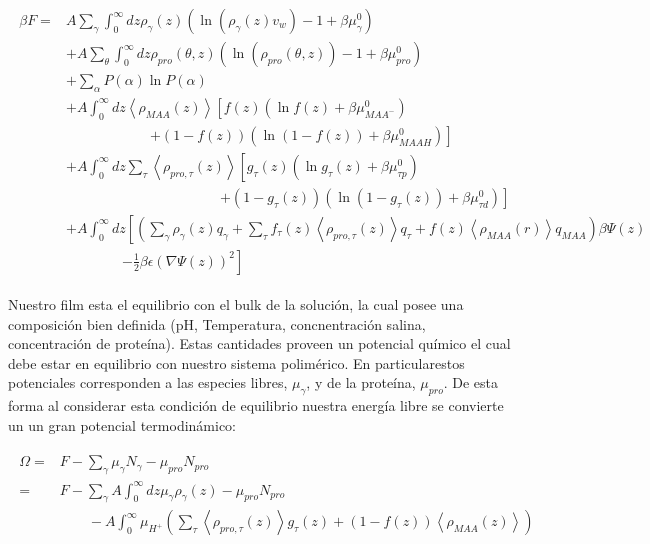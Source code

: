 \begin{align}
	\begin{aligned}
		\beta F=  & A\sum_{\gamma}\int_0^\infty{dz\rho_\gamma(z)\left(\ln \left(\rho_\gamma (z)v_w\right) -1 + \beta\mu^0_\gamma\right)} \\
		&+ A\sum_{\theta}\int_0^\infty{dz\rho_{pro}(\theta,z)\left(\ln \left(\rho_{pro}(\theta,z)\right) -1 + \beta\mu^0_{pro} \right)} \\
		&+ \sum_\alpha{P(\alpha)\ln P(\alpha)} \\
		& + A\int_0^\infty dz \left<\rho_{MAA}(z)\right> \left[f(z)(\ln f(z)+ \beta\mu^0_{MAA^-})\right.\\
		& \qquad\qquad\qquad \left.+(1-f(z))(\ln (1-f(z))+\beta\mu^0_{MAAH})\right] \\
		& + A\int_0^\infty dz \sum_\tau \left<\rho_{pro,\tau}(z)\right> \left[g_\tau(z)(\ln g_\tau(z)+ \beta\mu^0_{\tau p})\right.\\
		&\qquad \qquad \qquad\qquad \qquad\quad \left.+(1-g_\tau(z))(\ln (1-g_\tau(z))+\beta\mu^0_{\tau d})\right]   \\
		 & +A\int_0^\infty dz \left[\left(\sum_{\gamma } {\rho_\gamma(z) q_\gamma + \sum_\tau{f_\tau(z) \left<\rho_{pro,\tau}(z)\right> q_\tau} +  f(z)\left<\rho_{MAA}(r)\right>q_{MAA}}\right)\beta\Psi(z) \right. \\ & \qquad \qquad \left.-\frac{1}{2}\beta\epsilon(\nabla\Psi(z))^2 \right]
		\end{aligned}
\end{align}


Nuestro film esta el equilibrio con el bulk de la soluci\'on, la cual posee una composici\'on bien definida (pH, Temperatura, concnentraci\'on salina,  concentraci\'on de prote\'ina). Estas cantidades proveen un potencial qu\'imico el cual debe estar en equilibrio con nuestro sistema polim\'erico. En particularestos potenciales corresponden a las especies libres, $\mu_\gamma$, y de la prote\'ina, $\mu_{pro}$.
De esta forma al considerar esta condici\'on de equilibrio nuestra energ\'ia libre se convierte un un gran potencial termodin\'amico:

\begin{align}
	\begin{aligned}
		\Omega = &F - \sum_\gamma \mu_\gamma N_\gamma -  \mu_{pro} N_{pro} \\
			= &F -\sum_\gamma A\int_0^\infty dz \mu_\gamma \rho_\gamma(z) -  \mu_{pro} N_{pro}  \\
			& \qquad -A\int_0^\infty \mu_{H^+} \left( \sum_\tau\left< \rho_{pro,\tau}(z) \right>g_\tau(z) + (1-f(z))\left< \rho_{MAA}(z) \right> \right )
			\end{aligned}
		\label{eq:equil-qco}
\end{align}

